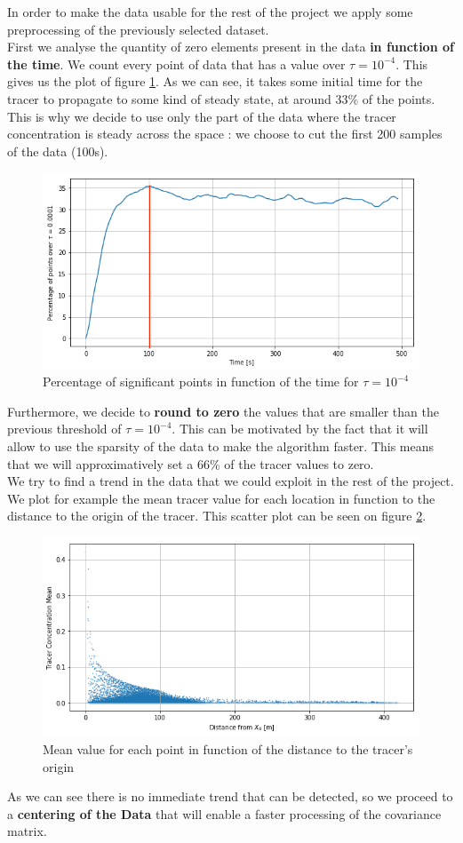In order to make the data usable for the rest of the project we apply some preprocessing of the previously selected dataset. \\

First we analyse the quantity of zero elements present in the data \textbf{in function of the time}. We count every point of data that has a value over $\tau = 10^{-4}$. This gives us the plot of figure \ref{fig:sumtime}. As we can see, it takes some initial time for the tracer to propagate to some kind of steady state, at around 33\% of the points. This is why we decide to use only the part of the data where the tracer concentration is steady across the space : we choose to cut the first 200 samples of the data (100s). \\

\begin{figure}[t]
\centering
	\includegraphics[width = 0.7 \textwidth]{figures/DataAnalysis/SumDataTime}
	\caption{Percentage of significant points in function of the time for $\tau = 10^{-4}$}
	\label{fig:sumtime}
\end{figure}


Furthermore, we decide to \textbf{round to zero} the values that are smaller than the previous threshold of $\tau = 10^{-4}$. This can be motivated by the fact that it will allow to use the sparsity of the data to make the algorithm faster. This means that we will approximatively set a 66\% of the tracer values to zero.\\

We try to find a trend in the data that we could exploit in the rest of the project. We plot for example the mean tracer value for each location in function to the distance to the origin of the tracer. This scatter plot can be seen on figure \ref{fig:tracerdistance}. 

\begin{figure}[b]
\centering
	\includegraphics[width = 0.7 \textwidth]{figures/DataAnalysis/TracerMeanDistance}
	\caption{Mean value for each point in function of the distance to the tracer's origin}
	\label{fig:tracerdistance}
\end{figure}


As we can see there is no immediate trend that can be detected, so we proceed to a \textbf{centering of the Data} that will enable a faster processing of the covariance matrix. 












